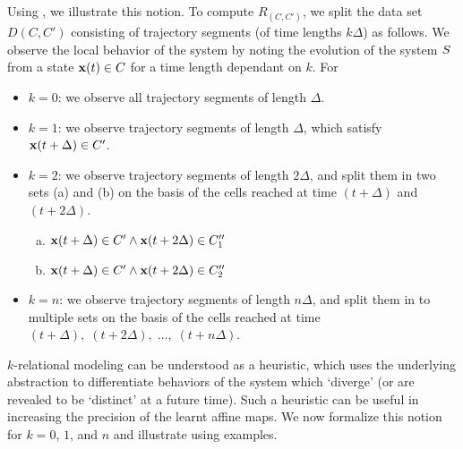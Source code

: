 Using , we illustrate this notion. To compute
$R_{(C,C')}$, we
split the data set $D(C,C')$ consisting of trajectory segments (of time lengths
$k\Delta$) as follows.  We observe the local behavior of the system by
noting the evolution of the system $S$ from a state $\mathbf{x}(t)
\in C$ for a time length dependant on $k$. For
\begin{itemize}
    \item{$k=0$}: we observe all trajectory segments of length $\Delta$.
    \item{$k=1$}: we observe trajectory segments of length $\Delta$, which satisfy $\mathbf{x}(t+\Delta) \in C'$.
    \item{$k=2$}: we observe trajectory segments of length $2\Delta$,
        and split them in two sets (a) and (b) on the basis of the
        cells reached at time $(t+\Delta)$ and $(t+2\Delta)$.
        \begin{enumerate}[(a)]
            \item $\mathbf{x}(t+\Delta) \in C' \land \mathbf{x}(t+2\Delta) \in C''_1$
            \item $\mathbf{x}(t+\Delta) \in C' \land \mathbf{x}(t+2\Delta) \in C''_2$
        \end{enumerate}
    \item{$k=n$}: we observe trajectory segments of length $n\Delta$,
        and split them in to multiple sets on the basis of the cells
        reached at time $(t+\Delta),\; (t+2\Delta),\;
        \ldots,\;(t+n\Delta)$.
\end{itemize}

$k$-relational modeling can be understood as a heuristic, which uses
the underlying abstraction to differentiate behaviors of the system
which `diverge' (or are revealed to be `distinct' at a future time).
Such a heuristic can be useful in increasing the precision of the
learnt affine maps.  We now formalize this notion for $k=0$, $1$, and
$n$ and illustrate using examples.


